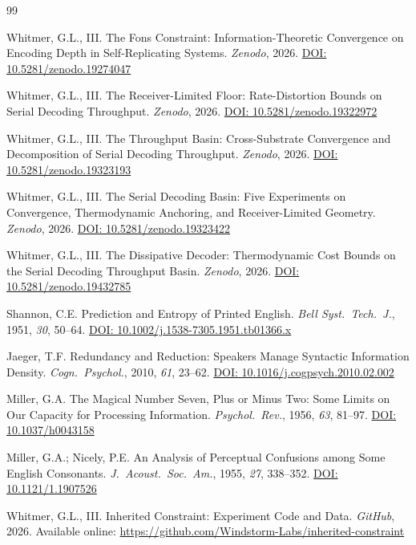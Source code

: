 \documentclass[11pt]{article}
\begin{document}
\begin{thebibliography}{99}

Whitmer, G.L., III.
The Fons Constraint: Information-Theoretic Convergence on Encoding Depth in Self-Replicating Systems.
\emph{Zenodo}, 2026.
\href{https://doi.org/10.5281/zenodo.19274047}{DOI: 10.5281/zenodo.19274047}

Whitmer, G.L., III.
The Receiver-Limited Floor: Rate-Distortion Bounds on Serial Decoding Throughput.
\emph{Zenodo}, 2026.
\href{https://doi.org/10.5281/zenodo.19322972}{DOI: 10.5281/zenodo.19322972}

Whitmer, G.L., III.
The Throughput Basin: Cross-Substrate Convergence and Decomposition of Serial Decoding Throughput.
\emph{Zenodo}, 2026.
\href{https://doi.org/10.5281/zenodo.19323193}{DOI: 10.5281/zenodo.19323193}

Whitmer, G.L., III.
The Serial Decoding Basin: Five Experiments on Convergence, Thermodynamic Anchoring, and Receiver-Limited Geometry.
\emph{Zenodo}, 2026.
\href{https://doi.org/10.5281/zenodo.19323422}{DOI: 10.5281/zenodo.19323422}

Whitmer, G.L., III.
The Dissipative Decoder: Thermodynamic Cost Bounds on the Serial Decoding Throughput Basin.
\emph{Zenodo}, 2026.
\href{https://doi.org/10.5281/zenodo.19432785}{DOI: 10.5281/zenodo.19432785}

Shannon, C.E.
Prediction and Entropy of Printed English.
\emph{Bell Syst.\ Tech.\ J.}, 1951, \emph{30}, 50--64.
\href{https://doi.org/10.1002/j.1538-7305.1951.tb01366.x}{DOI: 10.1002/j.1538-7305.1951.tb01366.x}

Jaeger, T.F.
Redundancy and Reduction: Speakers Manage Syntactic Information Density.
\emph{Cogn.\ Psychol.}, 2010, \emph{61}, 23--62.
\href{https://doi.org/10.1016/j.cogpsych.2010.02.002}{DOI: 10.1016/j.cogpsych.2010.02.002}

Miller, G.A.
The Magical Number Seven, Plus or Minus Two: Some Limits on Our Capacity for Processing Information.
\emph{Psychol.\ Rev.}, 1956, \emph{63}, 81--97.
\href{https://doi.org/10.1037/h0043158}{DOI: 10.1037/h0043158}

Miller, G.A.; Nicely, P.E.
An Analysis of Perceptual Confusions among Some English Consonants.
\emph{J.\ Acoust.\ Soc.\ Am.}, 1955, \emph{27}, 338--352.
\href{https://doi.org/10.1121/1.1907526}{DOI: 10.1121/1.1907526}

Whitmer, G.L., III.
Inherited Constraint: Experiment Code and Data.
\emph{GitHub}, 2026.
Available online: \url{https://github.com/Windstorm-Labs/inherited-constraint}

\end{thebibliography}
\end{document}
